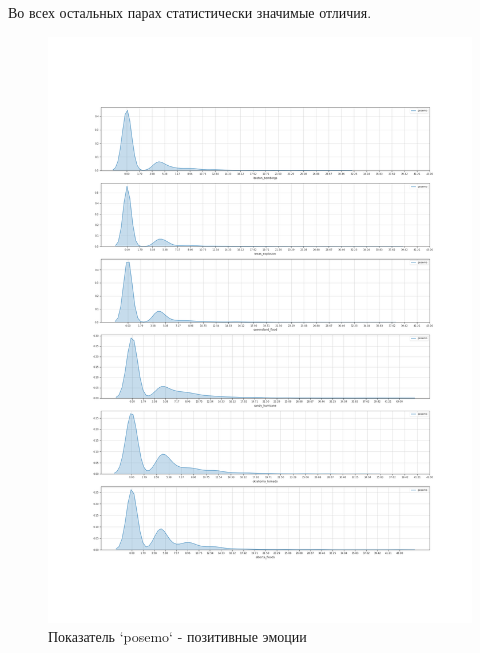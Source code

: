 \documentclass[11pt]{article}
\begin{document}
    Во всех остальных парах статистически значимые отличия.






\begin{figure}
\centering
\includegraphics[width=\textwidth]{posemo.png}
\caption{Показатель `posemo` - позитивные эмоции}\label{posemo}
\end{figure}
\end{document}
